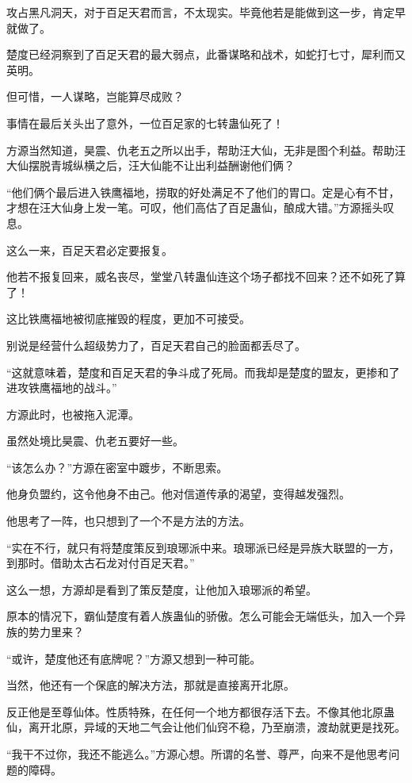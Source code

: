 \begin{this_body}
攻占黑凡洞天，对于百足天君而言，不太现实。毕竟他若是能做到这一步，肯定早就做了。

楚度已经洞察到了百足天君的最大弱点，此番谋略和战术，如蛇打七寸，犀利而又英明。

但可惜，一人谋略，岂能算尽成败？

事情在最后关头出了意外，一位百足家的七转蛊仙死了！

方源当然知道，昊震、仇老五之所以出手，帮助汪大仙，无非是图个利益。帮助汪大仙摆脱青城纵横之后，汪大仙能不让出利益酬谢他们俩？

“他们俩个最后进入铁鹰福地，捞取的好处满足不了他们的胃口。定是心有不甘，才想在汪大仙身上发一笔。可叹，他们高估了百足蛊仙，酿成大错。”方源摇头叹息。

这么一来，百足天君必定要报复。

他若不报复回来，威名丧尽，堂堂八转蛊仙连这个场子都找不回来？还不如死了算了！

这比铁鹰福地被彻底摧毁的程度，更加不可接受。

别说是经营什么超级势力了，百足天君自己的脸面都丢尽了。

“这就意味着，楚度和百足天君的争斗成了死局。而我却是楚度的盟友，更掺和了进攻铁鹰福地的战斗。”

方源此时，也被拖入泥潭。

虽然处境比昊震、仇老五要好一些。

“该怎么办？”方源在密室中踱步，不断思索。

他身负盟约，这令他身不由己。他对信道传承的渴望，变得越发强烈。

他思考了一阵，也只想到了一个不是方法的方法。

“实在不行，就只有将楚度策反到琅琊派中来。琅琊派已经是异族大联盟的一方，到那时。借助太古石龙对付百足天君。”

这么一想，方源却是看到了策反楚度，让他加入琅琊派的希望。

原本的情况下，霸仙楚度有着人族蛊仙的骄傲。怎么可能会无端低头，加入一个异族的势力里来？

“或许，楚度他还有底牌呢？”方源又想到一种可能。

当然，他还有一个保底的解决方法，那就是直接离开北原。

反正他是至尊仙体。性质特殊，在任何一个地方都很存活下去。不像其他北原蛊仙，离开北原，异域的天地二气会让他们仙窍不稳，乃至崩溃，渡劫就更是找死。

“我干不过你，我还不能逃么。”方源心想。所谓的名誉、尊严，向来不是他思考问题的障碍。


\end{this_body}
